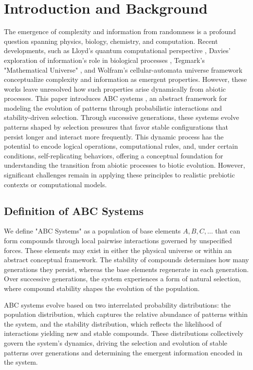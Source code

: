 \documentclass[entropy,article,submit,pdftex,oneauthor]{Definitions/mdpi}
\begin{document}
\section{Introduction and Background}

The emergence of complexity and information from randomness is a profound question spanning physics, biology, chemistry, and computation. Recent developments, such as Lloyd's quantum computational perspective \cite{lloyd2006programming}, Davies' exploration of information's role in biological processes \cite{davies2019demon}, Tegmark's "Mathematical Universe" \cite{tegmark2008mathematical}, and Wolfram's cellular-automata universe framework \cite{wolfram2020fundamental} conceptualize complexity and information as emergent properties. However, these works leave unresolved how such properties arise dynamically from abiotic processes. This paper introduces ABC systems \cite{adler2024howinfoevolves}, an abstract framework for modeling the evolution of patterns through probabilistic interactions and stability-driven selection. Through successive generations, these systems evolve patterns shaped by selection pressures that favor stable configurations that persist longer and interact more frequently. This dynamic process has the potential to encode logical operations, computational rules, and, under certain conditions, self-replicating behaviors, offering a conceptual foundation for understanding the transition from abiotic processes to biotic evolution. However, significant challenges remain in applying these principles to realistic prebiotic contexts or computational models.

\subsection{Definition of ABC Systems}

We define "ABC Systems" as a population of base elements \( A, B, C, \dots \) that can form compounds through local pairwise interactions governed by unspecified forces. These elements may exist in either the physical universe or within an abstract conceptual framework. The stability of compounds determines how many generations they persist, whereas the base elements regenerate in each generation. Over successive generations, the system experiences a form of natural selection, where compound stability shapes the evolution of the population.

ABC systems evolve based on two interrelated probability distributions: the population distribution, which captures the relative abundance of patterns within the system, and the stability distribution, which reflects the likelihood of interactions yielding new and stable compounds. These distributions collectively govern the system's dynamics, driving the selection and evolution of stable patterns over generations and determining the emergent information encoded in the system.
\end{document}

